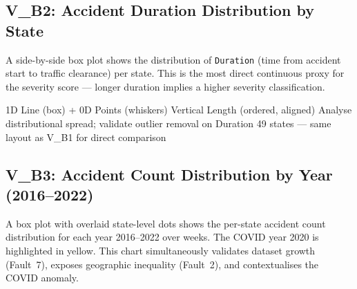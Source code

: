 \subsection{V\_B2: Accident Duration Distribution by State}

A side-by-side box plot shows the distribution of \texttt{Duration}
(time from accident start to traffic clearance) per state. This is the most
direct continuous proxy for the severity score --- longer duration implies a
higher severity classification.

\begin{figure}[H]
  \centering
  \label{fig:vb2}
\end{figure}

\idiomtable
  {1D Line (box) + 0D Points (whiskers)}
  {Vertical Length (ordered, aligned)}
  {Analyse distributional spread; validate outlier removal on Duration}
  {49 states --- same layout as V\_B1 for direct comparison}


\subsection{V\_B3: Accident Count Distribution by Year (2016--2022)}

A box plot with overlaid state-level dots shows the per-state accident count
distribution for each year 2016--2022 over weeks. The COVID year 2020 is highlighted in
yellow. This chart simultaneously validates dataset growth (Fault~7), exposes
geographic inequality (Fault~2), and contextualises the COVID anomaly.

